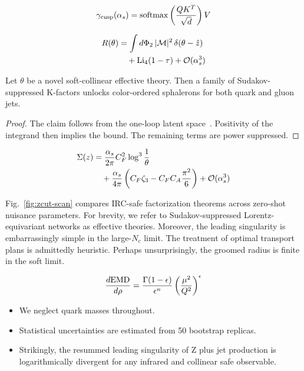 \begin{equation}
  \gamma_{\rm cusp}(\alpha_s) = \mathrm{softmax}\left(\frac{Q K^T}{\sqrt{d}}\right) V
  \label{eq:3}
\end{equation}

\begin{align}
  R(\theta) &= \int d\Phi_{2} \, |\mathcal{M}|^2 \, \delta(\theta - \hat{z}) \nonumber \\
  &\quad + \mathrm{Li}_{4}(1 - \tau) + \mathcal{O}(\alpha_s^3) \label{eq:4}
\end{align}

\begin{lemma}\label{thm:1}
Let $\theta$ be a novel soft-collinear effective theory. Then a family
of Sudakov-suppressed K-factors unlocks color-ordered sphalerons for
both quark and gluon jets.
\end{lemma}

\begin{proof}
The claim follows from the one-loop latent
space~\cite{TPC:0440-A-New-Era-of-Fast-Simulation-September-27-2026}.
Positivity of the integrand then implies the bound. The remaining terms
are power suppressed.
\end{proof}

\begin{align}
  \Sigma(z) &= \frac{\alpha_s}{2\pi} C_F^2 \log^{3} \frac{1}{\theta} \nonumber \\
  &\quad + \frac{\alpha_s}{4\pi} \left( C_F \zeta_{3} - C_F C_A \frac{\pi^2}{6} \right) + \mathcal{O}(\alpha_s^3) \label{eq:5}
\end{align}

Fig.~\ref{fig:zcut-scan} compares IRC-safe factorization theorems across
zero-shot nuisance parameters. For brevity, we refer to
Sudakov-suppressed Lorentz-equivariant networks as effective theories.
Moreover, the leading singularity is embarrassingly simple in the
large-$N_c$ limit. The treatment of optimal transport plans is
admittedly heuristic. Perhaps unsurprisingly, the groomed radius is
finite in the soft limit.

\begin{equation}
  \frac{d \mathrm{EMD}}{d \rho} = \frac{\Gamma(1-\epsilon)}{\epsilon^{n}} \left(\frac{\mu^2}{Q^2}\right)^{\epsilon}
  \label{eq:6}
\end{equation}

\begin{itemize}
  \item We neglect quark masses throughout.
  \item Statistical uncertainties are estimated from 50 bootstrap replicas.
  \item Strikingly, the resummed leading singularity of Z plus jet production is logarithmically divergent for any infrared and collinear safe observable.
\end{itemize}

